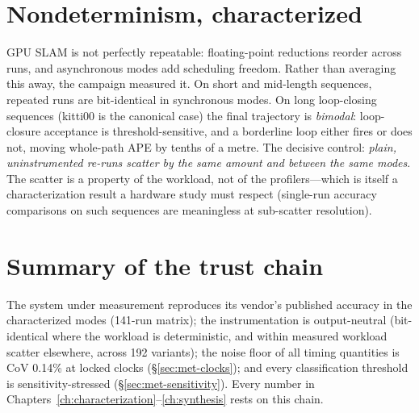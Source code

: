 \section{Nondeterminism, characterized}
\label{sec:val-nondeterminism}

GPU SLAM is not perfectly repeatable: floating-point reductions reorder
across runs, and asynchronous modes add scheduling freedom. Rather than
averaging this away, the campaign measured it. On short and mid-length
sequences, repeated runs are bit-identical in synchronous modes. On long
loop-closing sequences (kitti00 is the canonical case) the final trajectory
is \emph{bimodal}: loop-closure acceptance is threshold-sensitive, and a
borderline loop either fires or does not, moving whole-path APE by tenths
of a metre. The decisive control: \emph{plain, uninstrumented re-runs
scatter by the same amount and between the same modes}. The scatter is a
property of the workload, not of the profilers---which is itself a
characterization result a hardware study must respect (single-run accuracy
comparisons on such sequences are meaningless at sub-scatter resolution).

\section{Summary of the trust chain}

The system under measurement reproduces its vendor's published accuracy in
the characterized modes (141-run matrix); the instrumentation is
output-neutral (bit-identical where the workload is deterministic, and
within measured workload scatter elsewhere, across 192 variants); the noise
floor of all timing quantities is CoV 0.14\% at locked clocks
(\S\ref{sec:met-clocks}); and every classification threshold is
sensitivity-stressed (\S\ref{sec:met-sensitivity}). Every number in
Chapters~\ref{ch:characterization}--\ref{ch:synthesis} rests on this
chain.
